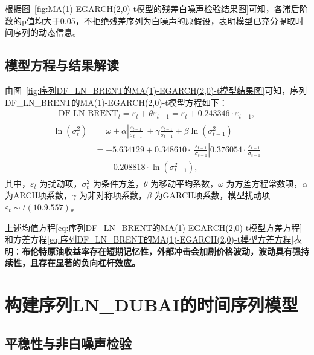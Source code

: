 \documentclass[12pt,a4paper]{ctexart}
\begin{document}
根据图~\ref{fig:MA(1)-EGARCH(2,0)-t模型的残差白噪声检验结果图}可知，各滞后阶数的p值均大于0.05，不拒绝残差序列为白噪声的原假设，表明模型已充分提取时间序列的动态信息。


\subsection{模型方程与结果解读}

由图~\ref{fig:序列DF_LN_BRENT的MA(1)-EGARCH(2,0)-t模型结果图}可知，序列DF\_LN\_BRENT的MA(1)-EGARCH(2,0)-t模型方程如下：
\begin{align}\label{eq:序列DF_LN_BRENT的MA(1)-EGARCH(2,0)-t模型均值方程}
\mathrm{DF}\_\mathrm{LN}\_\mathrm{BRENT}_t=\varepsilon _t+\theta \varepsilon _{t-1}=\varepsilon _t+0.243346\cdot \varepsilon _{t-1},
\end{align}
\begin{gather}\label{eq:序列DF_LN_BRENT的MA(1)-EGARCH(2,0)-t模型方差方程}
\begin{aligned}
\ln \left( \sigma _{t}^{2} \right) &=\omega +\alpha \left| \frac{\varepsilon _{t-1}}{\sigma _{t-1}} \right|+\gamma \frac{\varepsilon _{t-1}}{\sigma _{t-1}}+\beta \ln \left( \sigma _{t-1}^{2} \right) 
\\
&=-5.634129+0.348610\cdot \left| \frac{\varepsilon _{t-1}}{\sigma _{t-1}} \right|0.376054\cdot \frac{\varepsilon _{t-1}}{\sigma _{t-1}}
\\
&\quad -0.208818\cdot \ln \left( \sigma _{t-1}^{2} \right) ,
\end{aligned}
\end{gather}
其中，$\varepsilon_t$ 为扰动项，$\sigma_t^2$ 为条件方差，$\theta$ 为移动平均系数，$\omega$ 为方差方程常数项，$\alpha$ 为ARCH项系数，$\gamma$ 为非对称项系数，$\beta$ 为GARCH项系数，模型扰动项$\varepsilon_t\sim t(10.9.557)$。

上述均值方程\eqref{eq:序列DF_LN_BRENT的MA(1)-EGARCH(2,0)-t模型方差方程}和方差方程\eqref{eq:序列DF_LN_BRENT的MA(1)-EGARCH(2,0)-t模型方差方程}表明：\textbf{布伦特原油收益率存在短期记忆性，外部冲击会加剧价格波动，波动具有强持续性，且存在显著的负向杠杆效应。}

\newpage



\section{构建序列LN\_DUBAI的时间序列模型}

\subsection{平稳性与非白噪声检验}
\end{document}
